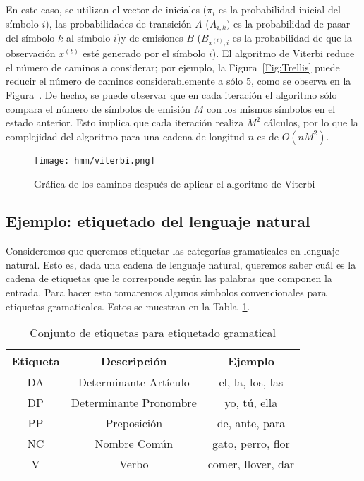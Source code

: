En este caso, se utilizan el vector de iniciales ($\pi_i$ es la probabilidad inicial del símbolo $i$), las probabilidades de transición $A$ ($A_{i, k})$ es la probabilidad de pasar del símbolo $k$ al símbolo $i$)y de emisiones $B$ ($B_{ x^{(t)}, i}$ es la probabilidad de que la observación $x^{(t)}$ esté generado por el símbolo $i$). El algoritmo de Viterbi reduce el número de caminos a considerar; por ejemplo, la Figura~\ref{Fig:Trellis} puede reducir el número de caminos considerablemente a sólo 5, como se observa en la Figura~. De hecho, se puede observar que en cada iteración el algoritmo sólo compara el número de símbolos de emisión $M$ con los mismos símbolos en el estado anterior. Esto implica que cada iteración realiza $M^2$ cálculos, por lo que la complejidad del algoritmo para una cadena de longitud $n$ es de $O(nM^2)$. 

\begin{figure}
    \centering
    \texttt{[image: hmm/viterbi.png]}
    \caption{Gráfica de los caminos después de aplicar el algoritmo de Viterbi}
    \label{Fig:Viterbi}
\end{figure}


\subsection{Ejemplo: etiquetado del lenguaje natural}

Consideremos que queremos etiquetar las categorías gramaticales en lenguaje natural. Esto es, dada una cadena de lenguaje natural, queremos saber cuál es la cadena de etiquetas que le corresponde según las palabras que componen la entrada. Para hacer esto tomaremos algunos símbolos convencionales para etiquetas gramaticales. Estos se muestran en la Tabla~\ref{tab:Tags}.

\begin{table}[]
    \centering
    \begin{tabular}{c c c} \\ \hline
        \textbf{Etiqueta} & \textbf{Descripción} & \textbf{Ejemplo}  \\ \hline
        DA & Determinante Artículo & el, la, los, las \\
        DP & Determinante Pronombre & yo, tú, ella \\
        PP & Preposición & de, ante, para \\
        NC & Nombre Común & gato, perro, flor \\
        V & Verbo & comer, llover, dar \\ \hline
    \end{tabular}
    \caption{Conjunto de etiquetas para etiquetado gramatical}
    \label{tab:Tags}
\end{table}

